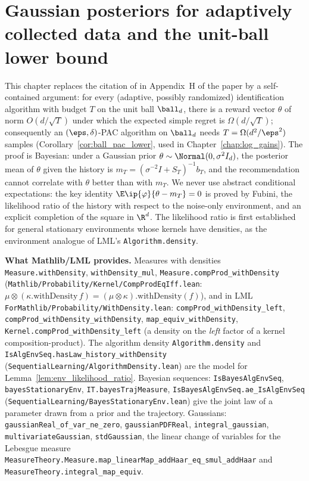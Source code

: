 \chapter{Gaussian posteriors for adaptively collected data and the unit-ball lower bound}
\label{chap:pre_bayes}

This chapter replaces the citation of \cite{chen2024assouad} in Appendix~H of the paper by a
self-contained argument: for every (adaptive, possibly randomized) identification algorithm
with budget $T$ on the unit ball $\ball_d$, there is a reward vector $\theta$ of norm
$O(d/\sqrt T)$ under which the expected simple regret is $\Omega(d/\sqrt T)$; consequently an
$(\eps,\delta)$-PAC algorithm on $\ball_d$ needs $T = \Omega(d^2/\eps^2)$ samples
(Corollary~\ref{cor:ball_pac_lower}, used in Chapter~\ref{chap:log_gains}). The proof is
Bayesian: under a Gaussian prior $\theta\sim\Normal(0,\sigma^2I_d)$, the posterior mean of
$\theta$ given the history is $m_T = (\sigma^{-2}I+S_T)^{-1}b_T$, and the recommendation cannot
correlate with $\theta$ better than with $m_T$. We never use abstract conditional expectations:
the key identity $\E\ip{\varphi}{\theta-m_T} = 0$ is proved by Fubini, the likelihood ratio of
the history with respect to the noise-only environment, and an explicit completion of the
square in $\R^d$. The likelihood ratio is first established for general stationary environments
whose kernels have densities, as the environment analogue of LML's \texttt{Algorithm.density}.

\textbf{What Mathlib/LML provides.} Measures with densities \texttt{Measure.withDensity},
\texttt{withDensity\_mul}, \texttt{Measure.compProd\_withDensity}
(\texttt{Mathlib/Probability/Kernel/CompProdEqIff.lean}: $\mu\otimes(\kappa.\mathrm{withDensity}\,f) = (\mu\otimes\kappa).\mathrm{withDensity}(f)$),
and in LML \texttt{ForMathlib/Probability/WithDensity.lean}: \texttt{compProd\_withDensity\_left},
\texttt{compProd\_withDensity\_withDensity}, \texttt{map\_equiv\_withDensity},
\texttt{Kernel.compProd\_withDensity\_left} (a density on the \emph{left} factor of a kernel
composition-product). The algorithm density
\texttt{Algorithm.density} and \texttt{IsAlgEnvSeq.hasLaw\_history\_withDensity}
(\texttt{SequentialLearning/AlgorithmDensity.lean}) are the model for
Lemma~\ref{lem:env_likelihood_ratio}. Bayesian sequences: \texttt{IsBayesAlgEnvSeq},
\texttt{bayesStationaryEnv}, \texttt{IT.bayesTrajMeasure}, \texttt{IsBayesAlgEnvSeq.ae\_IsAlgEnvSeq}
(\texttt{SequentialLearning/BayesStationaryEnv.lean}) give the joint law of a parameter drawn
from a prior and the trajectory. Gaussians: \texttt{gaussianReal\_of\_var\_ne\_zero},
\texttt{gaussianPDFReal}, \texttt{integral\_gaussian}, \texttt{multivariateGaussian},
\texttt{stdGaussian}, the linear change of variables for the Lebesgue measure
\texttt{MeasureTheory.Measure.map\_linearMap\_addHaar\_eq\_smul\_addHaar} and
\texttt{MeasureTheory.integral\_map\_equiv}.

